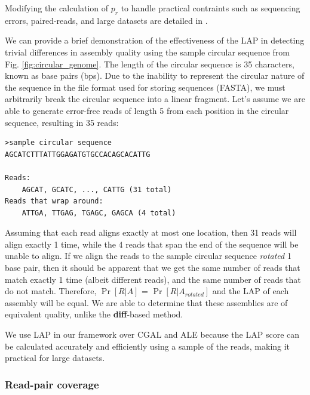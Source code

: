 \documentclass[12pt,\mydriver]{thesis}
\begin{document}
Modifying the calculation of $p_r$ to handle practical contraints such as sequencing errors, paired-reads, and large datasets are detailed in \cite{LAP}.







We can provide a brief demonstration of the effectiveness of the LAP in detecting trivial differences in assembly quality using the sample circular sequence from Fig. \ref{fig:circular_genome}.
The length of the circular sequence is 35 characters, known as base pairs (bps).
Due to the inability to represent the circular nature of the sequence in the file format used for storing sequences (FASTA), we must arbitrarily break the circular sequence into a linear fragment.
Let's assume we are able to generate error-free reads of length 5 from each position in the circular sequence, resulting in 35 reads:
\begin{verbatim}>sample circular sequence
AGCATCTTTATTGGAGATGTGCCACAGCACATTG

Reads:
    AGCAT, GCATC, ..., CATTG (31 total)
Reads that wrap around:
    ATTGA, TTGAG, TGAGC, GAGCA (4 total)
\end{verbatim}


Assuming that each read aligns exactly at most one location, then 31 reads will align exactly 1 time, while the 4 reads that span the end of the sequence will be unable to align.
If we align the reads to the sample circular sequence \emph{rotated} 1 base pair, then it should be apparent that we get the same number of reads that match exactly 1 time (albeit different reads), and the same number of reads that do not match.
Therefore, $\Pr[R \vert A]$ = $\Pr[R \vert A_{rotated}]$ and the LAP of each assembly will be equal.
We are able to determine that these assemblies are of equivalent quality, unlike the \textbf{diff}-based method.


We use LAP in our framework over CGAL and ALE because the LAP score can be calculated accurately and efficiently using a sample of the reads, making it practical for large datasets.


\subsubsection{Read-pair coverage}
\end{document}
